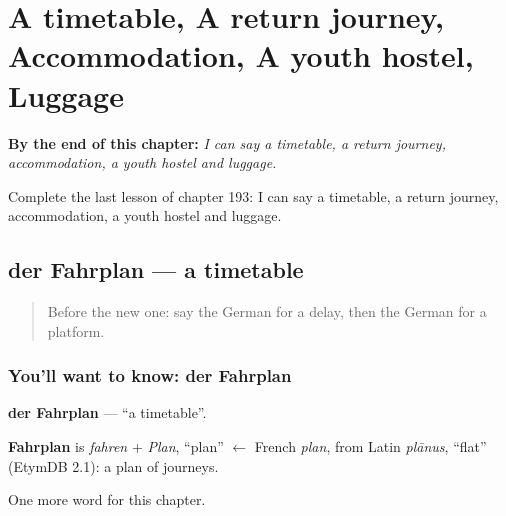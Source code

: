
\chapter{A timetable, A return journey, Accommodation, A youth hostel, Luggage}
\label{ch:ge-a-timetable-a-return-journey-accommodation-a-youth-hostel-luggage}

\begin{chapteropening}
\textbf{By the end of this chapter:} \emph{I can say a timetable, a return journey, accommodation, a youth hostel and luggage.}

Complete the last lesson of chapter 193: I can say a timetable, a return journey, accommodation, a youth hostel and luggage.
\end{chapteropening}

\section[der Fahrplan]{der Fahrplan — a timetable}

\label{lesson:GE-C193-fahrplan}



\begin{quote}
Before the new one: say the German for a delay, then the German for a platform.
\end{quote}

\subsection*{You'll want to know: der Fahrplan}
\textbf{der Fahrplan} — \textquotedblleft{}a timetable\textquotedblright{}.

\begin{cousinweb}
\textbf{Fahrplan} is \emph{fahren} + \emph{Plan}, \textquotedblleft{}plan\textquotedblright{} $\leftarrow$ French \emph{plan}, from Latin \emph{plānus}, \textquotedblleft{}flat\textquotedblright{} (EtymDB 2.1): a plan of journeys.
\end{cousinweb}

\begin{grammarlens}[title={What you've built}]
One more word for this chapter.
\end{grammarlens}

